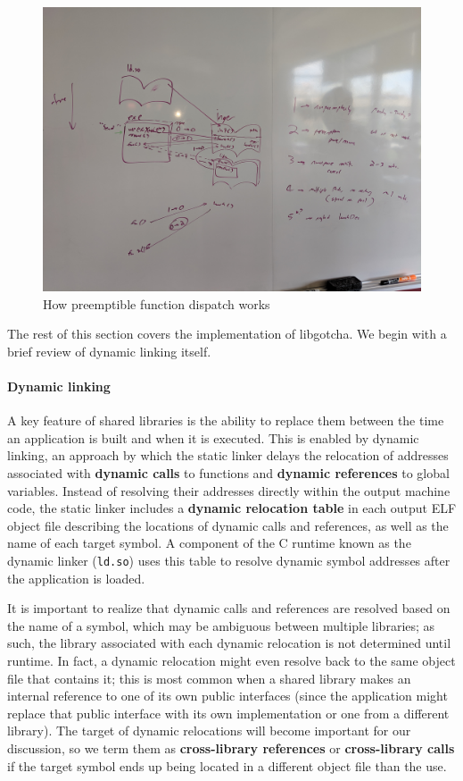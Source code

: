 \begin{figure}
\includegraphics[width=\columnwidth]{figs/calltree}
\caption{How preemptible function dispatch works}
\label{fig:callwhitelist}
\end{figure}

The rest of this section covers the implementation of libgotcha.  We begin with a
brief review of dynamic linking itself.

\paragraph{Dynamic linking}

A key feature of shared libraries is the ability to replace them between the time an
application is built and when it is executed.  This is enabled by dynamic linking, an
approach by which the static linker delays the relocation of addresses associated
with \textbf{dynamic calls} to functions and \textbf{dynamic references} to global
variables.  Instead of resolving their addresses directly within the output machine
code, the static linker includes a
\textbf{dynamic relocation table} in each output ELF object file describing the
locations of dynamic calls and references, as well as the name of each target symbol.
A component of the C runtime known as the dynamic linker (\texttt{ld.so}) uses this
table to resolve dynamic symbol addresses after the application is loaded.

It is important to realize that dynamic calls and references are resolved based on
the name of a symbol, which may be ambiguous between multiple libraries; as such, the
library associated with each dynamic relocation is not determined until runtime.
In fact, a dynamic relocation might even resolve back to the same object file that
contains it; this is most common when a shared library makes an internal reference to
one of its own public interfaces (since the application might replace that public
interface with its own implementation or one from a different library).  The target
of dynamic relocations will become important for our discussion, so we term them as
\textbf{cross-library references} or \textbf{cross-library calls} if the target
symbol ends up being located in a different object file than the use.


